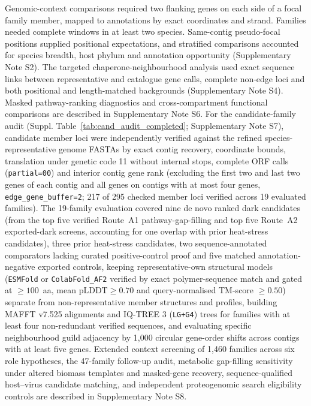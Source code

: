 \documentclass[11pt]{article}
\begin{document}
Genomic-context comparisons required two flanking genes on each side of a focal family member, mapped to annotations by exact coordinates and strand. Families needed complete windows in at least two species. Same-contig pseudo-focal positions supplied positional expectations, and stratified comparisons accounted for species breadth, host phylum and annotation opportunity (Supplementary Note S2). The targeted chaperone-neighbourhood analysis used exact sequence links between representative and catalogue gene calls, complete non-edge loci and both positional and length-matched backgrounds (Supplementary Note S4). Masked pathway-ranking diagnostics and cross-compartment functional comparisons are described in Supplementary Note S6. For the candidate-family audit (Suppl. Table~\ref{tab:cand_audit_completed}; Supplementary Note S7), candidate member loci were independently verified against the refined species-representative genome FASTAs by exact contig recovery, coordinate bounds, translation under genetic code 11 without internal stops, complete ORF calls (\texttt{partial=00}) and interior contig gene rank (excluding the first two and last two genes of each contig and all genes on contigs with at most four genes, \texttt{edge\_gene\_buffer=2}; 217 of 295 checked member loci verified across 19 evaluated families). The 19-family evaluation covered nine de novo ranked dark candidates (from the top five verified Route~A1 pathway-gap-filling and top five Route~A2 exported-dark screens, accounting for one overlap with prior heat-stress candidates), three prior heat-stress candidates, two sequence-annotated comparators lacking curated positive-control proof and five matched annotation-negative exported controls, keeping representative-own structural models (\texttt{ESMFold} or \texttt{ColabFold\_AF2} verified by exact polymer-sequence match and gated at $\geq 100$~aa, mean $\mathrm{pLDDT}\geq 0.70$ and query-normalised TM-score $\geq 0.50$) separate from non-representative member structures and profiles, building MAFFT v7.525 alignments and IQ-TREE 3 (\texttt{LG+G4}) trees for families with at least four non-redundant verified sequences, and evaluating specific neighbourhood guild adjacency by 1,000 circular gene-order shifts across contigs with at least five genes. Extended context screening of 1,460 families across six role hypotheses, the 47-family follow-up audit, metabolic gap-filling sensitivity under altered biomass templates and masked-gene recovery, sequence-qualified host--virus candidate matching, and independent proteogenomic search eligibility controls are described in Supplementary Note S8.
\end{document}
